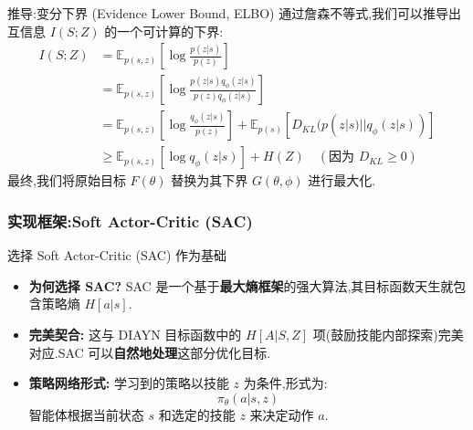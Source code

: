 \documentclass{beamer}
\begin{document}
\begin{frame}
    \begin{block}{推导:变分下界 (Evidence Lower Bound, ELBO)}
        通过詹森不等式,我们可以推导出互信息 $I(S;Z)$ 的一个可计算的下界:
        \begin{align*}
            I(S; Z) &= \mathbb{E}_{p(s,z)}\left[\log \frac{p(z|s)}{p(z)}\right] \\
                    &= \mathbb{E}_{p(s,z)}\left[\log \frac{p(z|s)q_\phi(z|s)}{p(z)q_\phi(z|s)}\right] \\
                    &= \mathbb{E}_{p(s,z)}\left[\log \frac{q_\phi(z|s)}{p(z)}\right] + \mathbb{E}_{p(s)}\left[ D_{KL}(p(z|s) || q_\phi(z|s)) \right] \\
                    &\ge \mathbb{E}_{p(s,z)}\left[\log q_\phi(z|s)\right] + H(Z) \quad (\text{因为 } D_{KL} \ge 0)
        \end{align*}
        最终,我们将原始目标 $F(\theta)$ 替换为其下界 $G(\theta, \phi)$ 进行最大化.
    \end{block}

\end{frame}

\begin{frame}
     \frametitle{ 实现框架:Soft Actor-Critic (SAC)}

    \begin{alertblock}{选择 Soft Actor-Critic (SAC) 作为基础}
        \begin{itemize}
            \item \textbf{为何选择 SAC?} SAC 是一个基于\textbf{最大熵框架}的强大算法,其目标函数天生就包含策略熵 $H[a|s]$.
            
            \item \textbf{完美契合:} 这与 DIAYN 目标函数中的 $H[A|S,Z]$ 项(鼓励技能内部探索)完美对应.SAC 可以\textbf{自然地处理}这部分优化目标.
            
            \item \textbf{策略网络形式:} 学习到的策略以技能 $z$ 为条件,形式为:
            \[
                \pi_\theta(a | s, z)
            \]
            智能体根据当前状态 $s$ 和选定的技能 $z$ 来决定动作 $a$.
        \end{itemize}
    \end{alertblock}
\end{frame}
\end{document}
